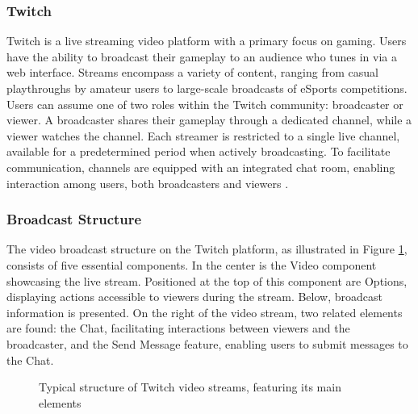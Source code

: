 \subsubsection{Twitch}
    Twitch is a live streaming video platform with a primary focus on gaming. Users have the ability to broadcast their gameplay to an audience who tunes in via a web interface. Streams encompass a variety of content, ranging from casual playthroughs by amateur users to large-scale broadcasts of eSports competitions. Users can assume one of two roles within the Twitch community: broadcaster or viewer. A broadcaster shares their gameplay through a dedicated channel, while a viewer watches the channel. Each streamer is restricted to a single live channel, available for a predetermined period when actively broadcasting. To facilitate communication, channels are equipped with an integrated chat room, enabling interaction among users, both broadcasters and viewers \cite{Twitch_streaming_platform}.

    \subsubsection*{Broadcast Structure}
    The video broadcast structure on the Twitch platform, as illustrated in Figure \ref{fig:TwitchStreamStructure}, consists of five essential components. In the center is the Video component showcasing the live stream. Positioned at the top of this component are Options, displaying actions accessible to viewers during the stream. Below, broadcast information is presented. On the right of the video stream, two related elements are found: the Chat, facilitating interactions between viewers and the broadcaster, and the Send Message feature, enabling users to submit messages to the Chat.

    \begin{figure}[htbp]
        \centering
        \fboxsep=0pt\fboxrule=0.5pt
        \caption{Typical structure of Twitch video streams, featuring its main elements}
        \label{fig:TwitchStreamStructure}
    \end{figure}

